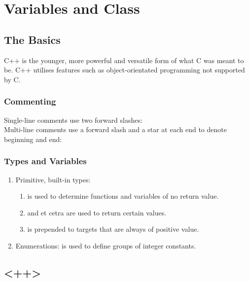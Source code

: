 \chapter{Variables and Class}

\section{The Basics}
C++ is the younger, more powerful and versatile form of what C was meant to be.
C++ utilises features such as object-orientated programming not supported by C.

\subsection{Commenting}
Single-line comments use two forward slashes: \\
Multi-line comments use a forward slash and a star at each end to denote
beginning and end: 

\subsection{Types and Variables}
\begin{enumerate}
\item Primitive, built-in types:
    \begin{enumerate}
    \item {} is used to determine functions and variables of no return
        value.
    \item {} and et cetra are used to return
        certain values.
    \item {} is prepended to targets that are always of positive
        value.
    \end{enumerate}
\item Enumerations:  is used to define groups of integer constants.
\end{enumerate}

\section{<++>}

